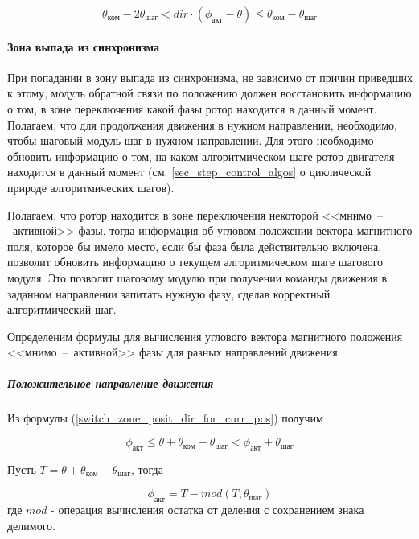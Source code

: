 \begin{equation}
    \label{switch_zone_for_delta}
    \theta_\textit{ком} - 2\theta_\textit{шаг}
    < dir \cdot (\phi_\textit{акт} - \theta)
    \leq \theta_\textit{ком} - \theta_\textit{шаг}
\end{equation}

\paragraph{Зона выпада из синхронизма}
При попадании в зону выпада из синхронизма, не зависимо от причин приведших к этому,
модуль обратной связи по положению должен восстановить информацию о том,
в зоне переключения какой фазы ротор находится в данный момент. Полагаем, что для
продолжения движения в нужном направлении, необходимо, чтобы шаговый модуль
шаг в нужном направлении. Для этого необходимо обновить информацию о том, на каком
алгоритмическом шаге ротор двигателя находится в данный момент
(см. \ref{sec_step_control_algos} о циклической природе алгоритмических шагов).

Полагаем, что ротор находится в зоне переключения некоторой <<мнимо~--~активной>> фазы,
тогда информация об угловом положении вектора магнитного поля, которое бы имело место,
если бы фаза была действительно включена, позволит обновить информацию о текущем
алгоритмическом шаге шагового модуля. Это позволит шаговому модулю при получении
команды движения в заданном направлении запитать нужную фазу, сделав корректный
алгоритмический шаг.

Определеним формулы для вычисления углового вектора магнитного положения
<<мнимо~--~активной>> фазы для разных направлений движения.

\subparagraph{Положительное направление движения}

Из формулы (\ref{switch_zone_posit_dir_for_curr_pos}) получим

\begin{equation}
    \label{sync_restore_posit_dir_active_pole_pos_conditions}
    \phi_\textit{акт}
    \leq \theta + \theta_\textit{ком} - \theta_\textit{шаг}
    < \phi_\textit{акт} + \theta_\textit{шаг}
\end{equation}

Пусть $T = \theta + \theta_\textit{ком} - \theta_\textit{шаг}$, тогда

\begin{equation}
    \label{sync_restore_posit_dir_active_pole_pos}
    \phi_\textit{акт} = T - mod(T, \theta_\textit{шаг})
\end{equation}
где $mod$ - операция вычисления остатка от деления с сохранением знака делимого.


